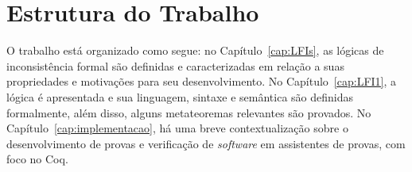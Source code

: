     \section{Estrutura do Trabalho}\label{sec:estrutura}
        O trabalho está organizado como segue: no Capítulo~\ref{cap:LFIs}, as lógicas de inconsistência formal são definidas e caracterizadas em relação a suas propriedades e motivações para seu desenvolvimento. No Capítulo~\ref{cap:LFI1}, a lógica \lfium{} é apresentada e sua linguagem, sintaxe e semântica são definidas formalmente, além disso, alguns metateoremas relevantes são provados. No Capítulo~\ref{cap:implementacao}, há uma breve contextualização sobre o desenvolvimento de provas e verificação de \textit{software} em assistentes de provas, com foco no Coq. 
        
    


       